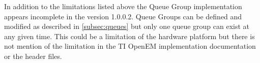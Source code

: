 In addition to the limitations listed above the Queue Group implementation
appears incomplete in the version 1.0.0.2. Queue Groups can be defined and
modified as described in \ref{subsec:queues} but only one queue group can exist
at any given time. This could be a limitation of the hardware platform but there
is not mention of the limitation in the TI OpenEM implementation documentation
or the header files.
